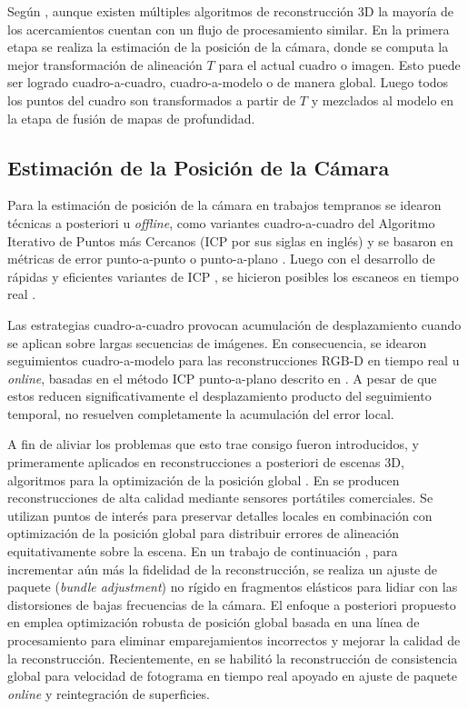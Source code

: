 Según \cite{zollhofer2018state}, aunque existen múltiples algoritmos de reconstrucción 3D la mayoría de los acercamientos cuentan con un flujo de procesamiento similar. En la primera etapa se realiza la estimación de la posición de la cámara, donde se computa la mejor transformación de alineación $T$ para el actual cuadro o imagen. Esto puede ser logrado cuadro-a-cuadro, cuadro-a-modelo o de manera global. Luego todos los puntos del cuadro son transformados a partir de $T$ y mezclados al modelo en la etapa de fusión de mapas de profundidad.

\subsection{Estimación de la Posición de la Cámara}

Para la estimación de posición de la cámara en trabajos tempranos se idearon técnicas a posteriori u \textit{offline}, como variantes cuadro-a-cuadro del Algoritmo Iterativo de Puntos más Cercanos (ICP por sus siglas en inglés) \cite{besl1992method, chen1992object} y se basaron en métricas de error punto-a-punto \cite{chen1992object} o punto-a-plano \cite{besl1992method}. Luego con el desarrollo de rápidas y eficientes variantes de ICP \cite{rusinkiewicz2001efficient}, se hicieron posibles los escaneos en tiempo real \cite{rusinkiewicz2002real}.

Las estrategias cuadro-a-cuadro provocan acumulación de desplazamiento cuando se aplican sobre largas secuencias de imágenes. En consecuencia, se idearon seguimientos cuadro-a-modelo \cite{chen2013scalable, izadi2011kinectfusion} para las reconstrucciones RGB-D en tiempo real u \textit{online}, basadas en el método ICP punto-a-plano descrito en \cite{low2004linear}. A pesar de que estos reducen significativamente el desplazamiento producto del seguimiento temporal, no resuelven completamente la acumulación del error local.

A fin de aliviar los problemas que esto trae consigo fueron introducidos, y primeramente aplicados en reconstrucciones a posteriori de escenas 3D,  algoritmos para la optimización de la posición global \cite{zhou2013dense, zhou2013elastic}. En \cite{zhou2013dense} se producen reconstrucciones de alta calidad mediante sensores portátiles comerciales. Se utilizan puntos de interés para preservar detalles locales en combinación con optimización de la posición global para distribuir errores de alineación equitativamente sobre la escena. En un trabajo de continuación \cite{zhou2013elastic}, para incrementar aún más la fidelidad de la reconstrucción, se realiza un ajuste de paquete (\textit{bundle adjustment}) no rígido en fragmentos elásticos para lidiar con las distorsiones de bajas frecuencias de la cámara. El enfoque a posteriori propuesto en \cite{choi2015robust} emplea optimización robusta de posición global basada en una línea de procesamiento para eliminar emparejamientos incorrectos y mejorar la calidad de la reconstrucción. Recientemente, en \cite{dai2017bundlefusion} se habilitó la reconstrucción de consistencia global para velocidad de fotograma en tiempo real apoyado en ajuste de paquete \textit{online} y reintegración de superficies.

